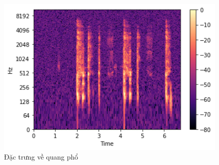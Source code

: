 \documentclass[a4paper, 12pt]{article}
\begin{document}
\begin{figure}[!h]
\captionsetup{width=0.8\textwidth}
\centering
\includegraphics[width=12.5cm]{images/4.1.png}
\caption{Đặc trưng về quang phổ}
\end{figure}
\end{document}

